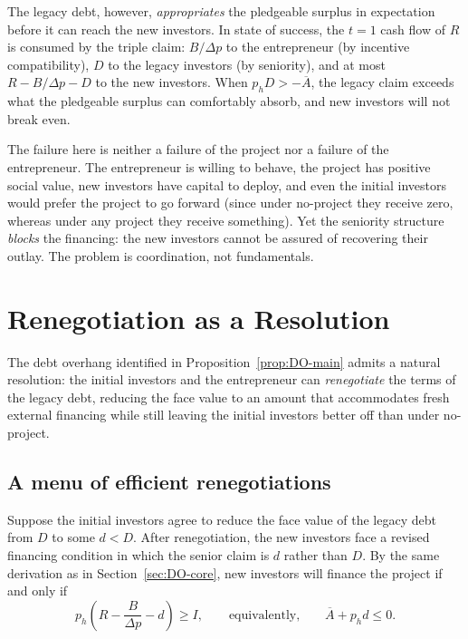\documentclass[11pt,a4paper,oneside]{book}
\def\leq{\leqslant}
\def\geq{\geqslant}
\theoremstyle{plain}
\theoremstyle{definition}
\theoremstyle{remark}
\numberwithin{equation}{chapter}
\begin{document}
The legacy debt, however, \emph{appropriates} the pledgeable surplus in expectation before it can reach the new investors.
In state of success, the $t=1$ cash flow of $R$ is consumed by the triple claim: $B/\Delta p$ to the entrepreneur (by incentive compatibility), $D$ to the legacy investors (by seniority), and at most $R - B/\Delta p - D$ to the new investors.
When $p_h D > -\overline{A}$, the legacy claim exceeds what the pledgeable surplus can comfortably absorb, and new investors will not break even.

The failure here is neither a failure of the project nor a failure of the entrepreneur.
The entrepreneur is willing to behave, the project has positive social value, new investors have capital to deploy, and even the initial investors would prefer the project to go forward (since under no-project they receive zero, whereas under any project they receive something).
Yet the seniority structure \emph{blocks} the financing: the new investors cannot be assured of recovering their outlay.
The problem is coordination, not fundamentals.

\section{Renegotiation as a Resolution}
\label{sec:DO-renegotiation}

The debt overhang identified in Proposition~\ref{prop:DO-main} admits a natural resolution: the initial investors and the entrepreneur can \emph{renegotiate} the terms of the legacy debt, reducing the face value to an amount that accommodates fresh external financing while still leaving the initial investors better off than under no-project.

\subsection{A menu of efficient renegotiations}

Suppose the initial investors agree to reduce the face value of the legacy debt from $D$ to some $d < D$.
After renegotiation, the new investors face a revised financing condition in which the senior claim is $d$ rather than $D$.
By the same derivation as in Section~\ref{sec:DO-core}, new investors will finance the project if and only if
\begin{equation}\label{eq:DO-IR-renegotiated}
  p_h \left( R - \frac{B}{\Delta p} - d \right) \geq I,
  \qquad \text{equivalently,} \qquad
  \overline{A} + p_h d \leq 0.
\end{equation}
\end{document}

